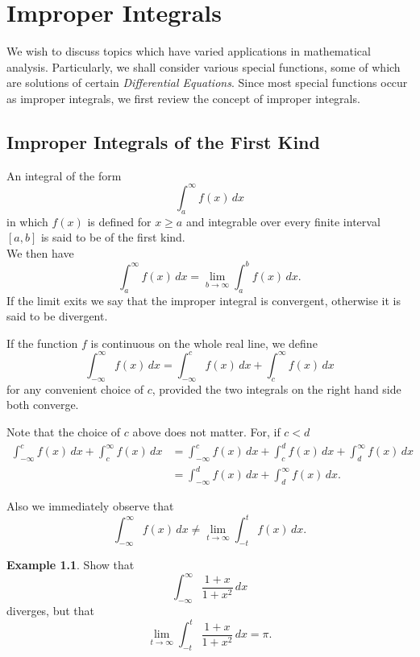 \documentclass[12pt,a4paper]{report}
\theoremstyle{definition}
\newtheorem{exa}[thm]{Example}
\theoremstyle{plain}
\begin{document}
     
\chapter{Improper Integrals}
\vspace*{-7mm}
We wish to discuss topics which have varied applications in mathematical analysis. Particularly, we shall consider various special functions, some of which are solutions of certain \textit{Differential Equations}. Since most special functions occur as improper integrals, we first review the concept of improper integrals.



\section{Improper Integrals of the First Kind}
An integral of the form $$\int_a^{\infty} f(x)\, dx$$ in which $f(x)$ is defined for $x\geq a$ and integrable over every finite interval $[a,b]$ is said to be of the first kind. \\
We then have $$\int_a^{\infty}f(x)\, dx = \lim_{b\rightarrow\infty}\int_a^bf(x)\, dx.$$
If the limit exits we say that the improper integral is convergent, otherwise it is said to be divergent.


If the function $f$ is continuous on the whole real line, we define
$$\int_{-\infty}^{\infty}f(x)\, dx = \int_{-\infty}^cf(x)\, dx + \int_c^{\infty} f(x)\, dx$$
for any convenient choice of $c$, provided the two integrals on the right hand side both converge.


Note that the choice of $c$ above does not matter. For, if $c<d$
\begin{align*}
\int_{-\infty}^cf(x)\, dx + \int_c^{\infty}f(x)\, dx & = \int_{-\infty}^cf(x)\, dx + \int_c^df(x)\, dx + \int_d^{\infty}f(x)\, dx\\
                                            & = \int^d_{-\infty}f(x)\, dx + \int_d^{\infty}f(x)\, dx.
\end{align*}

Also we immediately observe that
$$\int_{-\infty}^{\infty}f(x)\, dx \neq \lim_{t\rightarrow \infty} \int^t_{-t} f(x)\, dx.$$





\begin{exa}
Show that $$\int_{-\infty}^{\infty} \frac{1 + x}{1 + x^2}\, dx$$ diverges, but that $$\lim_{t\rightarrow\infty}\int_{-t}^{t} \frac{1 + x}{1 + x^2}\, dx = \pi .$$
\end{exa}
\end{document}
